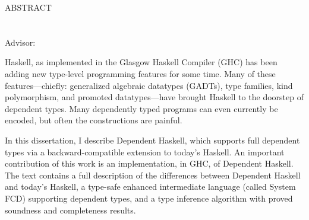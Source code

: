 \begin{doublespace}

\begin{centering}
{\Large ABSTRACT} \\
\Title \\
\Author \\
Advisor: \Advisor \\
\end{centering}

\vspace*{1in}

Haskell, as implemented in the Glasgow Haskell Compiler (GHC) has been adding
new type-level programming features for some time. Many of these features---chiefly: generalized algebraic datatypes (GADTs), type families, kind
polymorphism, and promoted datatypes---have brought Haskell to the doorstep
of dependent types. Many dependently typed programs can even currently be
encoded, but often the constructions are painful.

In this dissertation, I describe Dependent Haskell, which supports full
dependent types via a backward-compatible extension to today's Haskell. An
important contribution of this work is an implementation, in GHC, of Dependent
Haskell. The text contains a full description of the differences between
Dependent Haskell and today's Haskell, a type-safe enhanced intermediate
language (called System FCD) supporting dependent types, and a type inference
algorithm with proved soundness and completeness results.

\end{doublespace}
